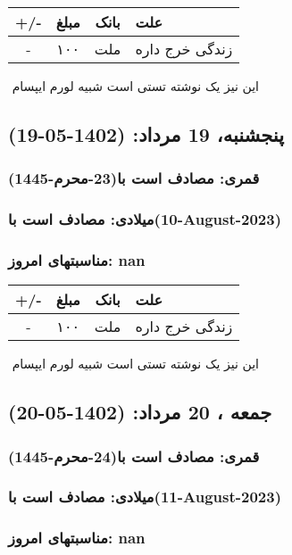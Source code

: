 \documentclass{article}
\newcommand{\rnote}[1]{\marginpar{\textcolor{color}{\StrSubstitute{\##1}{ }{\_}}}}
\newcommand{\myRow}[4]{
    #1 & #2 & #3 & #4 \\ \hline
}
\begin{document}
\begin{tabular}{ | c | c | c | p{5cm} |}
    \hline
    \myRow{ +/- }{مبلغ}{بانک}{علت}
    \myRow{-}{۱۰۰}{ملت}{زندگی خرج داره}
\end{tabular}
\newline
\newline

‌
\rnote{تست}
این نیز یک نوشته تستی است شبیه لورم ایپسام




\newpage
{}
\textcolor{color}{
\section{ پنجشنبه، 19 مرداد: (1402-05-19) }
\subsubsection*{قمری: مصادف است با(23-محرم-1445)} 
\subsubsection*{میلادی: مصادف است با(10-August-2023)}
\subsubsection*{مناسبتهای امروز: nan}
}


\begin{tabular}{ | c | c | c | p{5cm} |}
    \hline
    \myRow{ +/- }{مبلغ}{بانک}{علت}
    \myRow{-}{۱۰۰}{ملت}{زندگی خرج داره}
\end{tabular}
\newline
\newline

‌
\rnote{تست}
این نیز یک نوشته تستی است شبیه لورم ایپسام




\newpage
{}
\textcolor{color}{
\section{ جمعه ، 20 مرداد: (1402-05-20) }
\subsubsection*{قمری: مصادف است با(24-محرم-1445)} 
\subsubsection*{میلادی: مصادف است با(11-August-2023)}
\subsubsection*{مناسبتهای امروز: nan}
}
\end{document}
